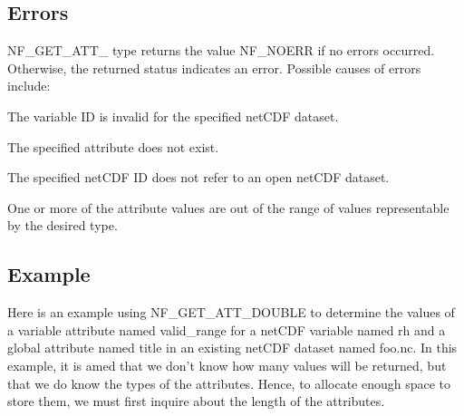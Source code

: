 \subsection*{Errors }

N\+F\+\_\+\+G\+E\+T\+\_\+\+A\+T\+T\+\_\+ type returns the value N\+F\+\_\+\+N\+O\+E\+RR if no errors occurred. Otherwise, the returned status indicates an error. Possible causes of errors include\+:


\begin{DoxyItemize}
\item The variable ID is invalid for the specified net\+C\+DF dataset.
\item The specified attribute does not exist.
\item The specified net\+C\+DF ID does not refer to an open net\+C\+DF dataset.
\item One or more of the attribute values are out of the range of values representable by the desired type.
\end{DoxyItemize}

\subsection*{Example }

Here is an example using N\+F\+\_\+\+G\+E\+T\+\_\+\+A\+T\+T\+\_\+\+D\+O\+U\+B\+LE to determine the values of a variable attribute named valid\+\_\+range for a net\+C\+DF variable named rh and a global attribute named title in an existing net\+C\+DF dataset named foo.\+nc. In this example, it is amed that we don’t know how many values will be returned, but that we do know the types of the attributes. Hence, to allocate enough space to store them, we must first inquire about the length of the attributes.

 

